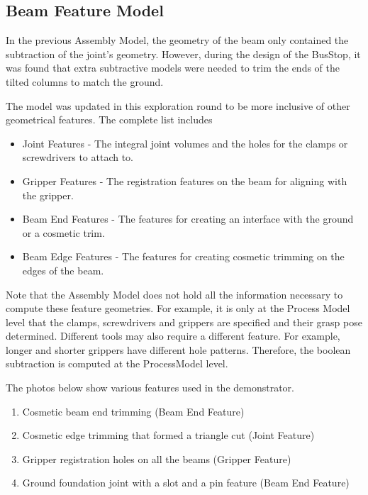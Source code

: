 \subsection{Beam Feature Model}
\label{subsection:exploration_4_beam_feature_model}

In the previous Assembly Model, the geometry of the beam only contained the subtraction of the joint's geometry. However, during the design of the BusStop, it was found that extra subtractive models were needed to trim the ends of the tilted columns to match the ground.

The model was updated in this exploration round to be more inclusive of other geometrical features. The complete list includes

\begin{itemize}
    \item Joint Features - The integral joint volumes and the holes for the clamps or screwdrivers to attach to.
    \item Gripper Features - The registration features on the beam for aligning with the gripper.
    \item Beam End Features - The features for creating an interface with the ground or a cosmetic trim.
    \item Beam Edge Features - The features for creating cosmetic trimming on the edges of the beam.
\end{itemize}

Note that the Assembly Model does not hold all the information necessary to compute these feature geometries. For example, it is only at the Process Model level that the clamps, screwdrivers and grippers are specified and their grasp pose determined. Different tools may also require a different feature. For example, longer and shorter grippers have different hole patterns. Therefore, the boolean subtraction is computed at the ProcessModel level.

The photos below show various features used in the demonstrator. 
\begin{enumerate}
    \item Cosmetic beam end trimming (Beam End Feature)
    \item Cosmetic edge trimming that formed a triangle cut  (Joint Feature)
    \item Gripper registration holes on all the beams (Gripper Feature)
    \item Ground foundation joint with a slot and a pin feature (Beam End Feature)
\end{enumerate}

